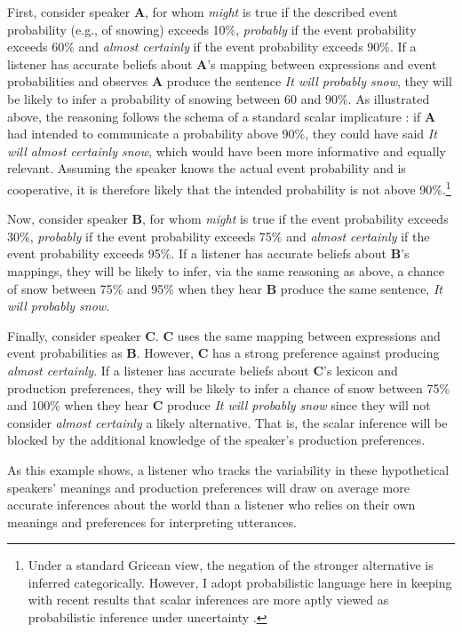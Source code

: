 First, consider speaker {\bf A}, for whom \textit{might} is true if the described event probability (e.g., of snowing) exceeds 10\%, 
\textit{probably} if the event probability exceeds 60\% and \textit{almost certainly}  if the event probability exceeds 90\%.  
If a listener has accurate beliefs about {\bf A}'s mapping between expressions and event probabilities and observes {\bf A} 
produce the sentence \emph{It will probably snow}, they will be likely to infer a probability of snowing between 60 and 90\%. 
As illustrated above, the reasoning follows the schema of a standard scalar implicature \cite{Grice1975, Horn1984}: if  {\bf A} 
had intended to communicate a probability above 90\%, they could have said \emph{It will almost certainly snow}, which would 
have been more informative and equally relevant. Assuming the speaker knows the actual event probability and is cooperative, 
it is therefore likely that the intended probability is not above 90\%.\footnote{Under a standard Gricean view, the negation of the 
stronger alternative is inferred categorically. However, I adopt probabilistic language here in keeping with recent results that scalar 
inferences are more aptly viewed as probabilistic inference under uncertainty \cite{Goodman2013}.} 

Now, consider speaker {\bf B}, for whom \textit{might} is true if the event probability exceeds 30\%, 
\textit{probably} if the event probability exceeds 75\% and \textit{almost certainly}  if the event probability exceeds 95\%. If a listener has
accurate beliefs about {\bf B}'s mappings, they will be likely to infer, via the same reasoning as above, a chance of snow between 75\% and 95\% when they hear {\bf B} produce the same sentence, \textit{It will probably snow}.

Finally, consider speaker {\bf C}. {\bf C} uses the same mapping between expressions and event probabilities as {\bf B}. However, {\bf C} has a strong preference against 
producing \textit{almost certainly}. If a listener has accurate beliefs about {\bf C}'s lexicon and production preferences, 
they will be likely to infer a chance of snow between 75\% and 100\% when they hear {\bf C} produce \textit{It will probably snow} since they will not
consider  \textit{almost certainly} a likely alternative. That is, the scalar inference will be blocked by the additional knowledge of the speaker's production preferences. 

As this example shows, a listener who tracks the variability in these hypothetical speakers' meanings and production preferences 
will draw on average more accurate inferences about the world than a listener who relies on their own meanings and preferences
for interpreting utterances.


